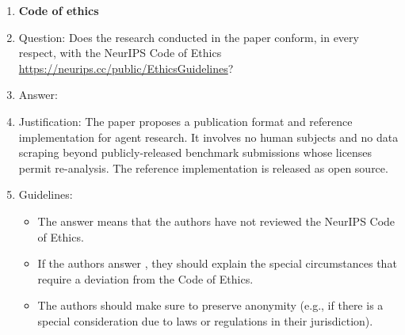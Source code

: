 \begin{enumerate}
\item {\bf Code of ethics}
    \item[] Question: Does the research conducted in the paper conform, in every respect, with the NeurIPS Code of Ethics \url{https://neurips.cc/public/EthicsGuidelines}?
    \item[] Answer: \answerYes{}
    \item[] Justification: The paper proposes a publication format and reference implementation for agent research. It involves no human subjects and no data scraping beyond publicly-released benchmark submissions whose licenses permit re-analysis. The reference implementation is released as open source.
    \item[] Guidelines:
    \begin{itemize}
        \item The answer \answerNA{} means that the authors have not reviewed the NeurIPS Code of Ethics.
        \item If the authors answer \answerNo, they should explain the special circumstances that require a deviation from the Code of Ethics.
        \item The authors should make sure to preserve anonymity (e.g., if there is a special consideration due to laws or regulations in their jurisdiction).
    \end{itemize}



\end{enumerate}
